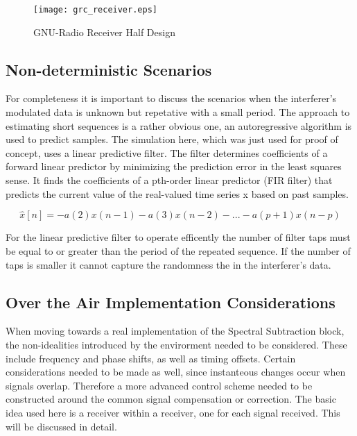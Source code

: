 \begin{figure}[!ht]\label{grc_receiver}
\centering
\texttt{[image: grc\_receiver.eps]}
\caption{GNU-Radio Receiver Half Design}
\end{figure}

\subsection{Non-deterministic Scenarios}

For completeness it is important to discuss the scenarios when the interferer's modulated data is unknown but repetative with a small period.  The approach to estimating short sequences is a rather obvious one, an autoregressive algorithm is used to predict samples.  The simulation here, which was just used for proof of concept, uses a linear predictive filter.  The filter determines coefficients of a forward linear predictor by minimizing the prediction error in the least squares sense\cite{lpcfilter}.  It finds the coefficients of a pth-order linear predictor (FIR filter) that predicts the current value of the real-valued time series x based on past samples.

\[ \hat{x}[n]=-a(2)x(n-1)-a(3)x(n-2)-...-a(p+1)x(n-p)\]

For the linear predictive filter to operate efficently the number of filter taps must be equal to or greater than the period of the repeated sequence.  If the number of taps is smaller it cannot capture the randomness the in the interferer's data.\\

\subsection{Over the Air Implementation Considerations}

When moving towards a real implementation of the Spectral Subtraction block, the non-idealities introduced by the envirorment needed to be considered.  These include frequency and phase shifts, as well as timing offsets.  Certain considerations needed to be made as well, since instanteous changes occur when signals overlap.  Therefore a more advanced control scheme needed to be constructed around the common signal compensation or correction.  The basic idea used here is a receiver within a receiver, one for each signal received.  This will be discussed in detail.\\

